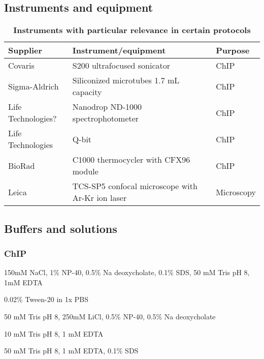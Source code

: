 \documentclass[11pt,twoside,a4paper]{report}
\begin{document}
    		\subsection{Instruments and equipment}
			\begin{table}[H]
       		\caption{\bf{Instruments with particular relevance in certain protocols}}
        		\begin{center}
            		\begin{tabular}{| p{2cm} | p{8cm} | p{3cm} |}
                		\hline
	               		\textbf{Supplier} & \textbf{Instrument/equipment} & \textbf{Purpose}\\
    		            \hline
						Covaris & S200 ultrafocused sonicator & ChIP\\
						\hline
						Sigma-Aldrich & Siliconized microtubes 1.7 mL capacity& ChIP\\
						\hline
						Life Technologies? & Nanodrop ND-1000 spectrophotometer & ChIP\\
						\hline
						Life Technologies & Q-bit & ChIP\\
						\hline
						BioRad & C1000 thermocycler with CFX96 module & ChIP\\
						\hline
						Leica & TCS-SP5 confocal microscope with Ar-Kr ion laser & Microscopy\\
	               		 \hline
	            \end{tabular}
    		    \end{center}
		    \end{table}
		    
		\subsection{Buffers and solutions}
			\subsubsection{ChIP}
				\begin{description}
					\footnotesize
					\item[Lysis buffer] 150mM NaCl, 1\% NP-40, 0.5\% Na deoxycholate, 0.1\% SDS, 50 mM Tris pH 8, 1mM EDTA
					\item[PBS-T] 0.02\% Tween-20 in 1x PBS
					\item[Lithium chloride buffer] 50 mM Tris pH 8, 250mM LiCl, 0.5\% NP-40, 0.5\% Na deoxycholate
					\item[TE buffer] 10 mM Tris pH 8, 1 mM EDTA
					\item[Elution buffer] 50 mM Tris pH 8, 1 mM EDTA, 0.1\% SDS
				\end{description}
				
\end{document}
